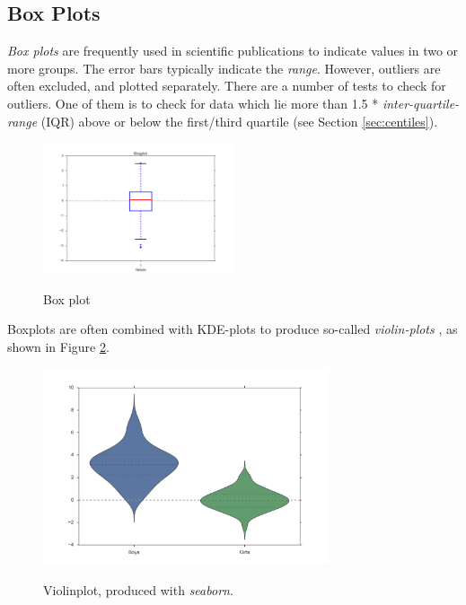 \subsection{Box Plots}

\emph{Box plots} are frequently used in scientific publications to indicate values in two or more groups. The error bars typically indicate the \emph{range}. However, outliers are often excluded, and plotted separately. There are a number of tests to check for outliers. One of them is to check for data which lie more than 1.5 * \emph{inter-quartile-range} (IQR) above or below the first/third quartile (see Section \ref{sec:centiles}).

\begin{figure}[!ht]
  \centering
  \includegraphics[width=0.5\textwidth]{../Images/boxplot.png}\\
  \caption{Box plot}\label{fig:Boxplot}
\end{figure}

Boxplots are often combined with KDE-plots to produce so-called \emph{violin-plots} , as shown in Figure \ref{fig:violin}.

\begin{figure}
  \centering
  \includegraphics[width=0.75\textwidth]{../Images/violinplot.png}\\
  \caption{Violinplot, produced with \emph{seaborn}.}\label{fig:violin}
\end{figure}

